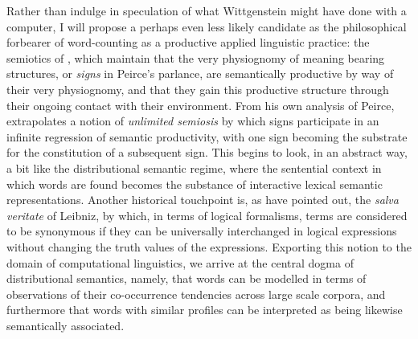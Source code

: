 Rather than indulge in speculation of what Wittgenstein might have done with a computer, I will propose a perhaps even less likely candidate as the philosophical forbearer of word-counting as a productive applied linguistic practice: the semiotics of \cite{Peirce1932}, which maintain that the very physiognomy of meaning bearing structures, or \emph{signs} in Peirce's parlance, are semantically productive by way of their very physiognomy, and that they gain this productive structure through their ongoing contact with their environment.  From his own analysis of Peirce, \cite{Eco1976} extrapolates a notion of \emph{unlimited semiosis} by which signs participate in an infinite regression of semantic productivity, with one sign becoming the substrate for the constitution of a subsequent sign.  This begins to look, in an abstract way, a bit like the distributional semantic regime, where the sentential context in which words are found becomes the substance of interactive lexical semantic representations.  Another historical touchpoint is, as \cite{MillerEA1991} have pointed out, the \emph{salva veritate} of Leibniz, by which, in terms of logical formalisms, terms are considered to be synonymous if they can be universally interchanged in logical expressions without changing the truth values of the expressions.  Exporting this notion to the domain of computational linguistics, we arrive at the central dogma of distributional semantics, namely, that words can be modelled in terms of observations of their co-occurrence tendencies across large scale corpora, and furthermore that words with similar profiles can be interpreted as being likewise semantically associated.

